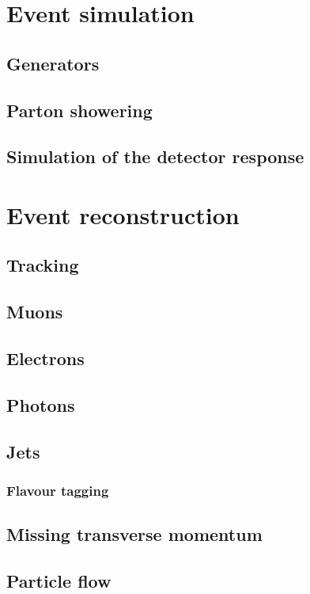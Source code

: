
\label{sec:RECO}
\section{Event simulation}
\subsection{Generators}
\subsection{Parton showering}
\subsection{Simulation of the detector response}

\section{Event reconstruction}
\subsection{Tracking}
\subsection{Muons}
\subsection{Electrons}
\subsection{Photons}
\subsection{Jets}
\subsubsection*{Flavour tagging}
\subsection{Missing transverse momentum}
\subsection{Particle flow}